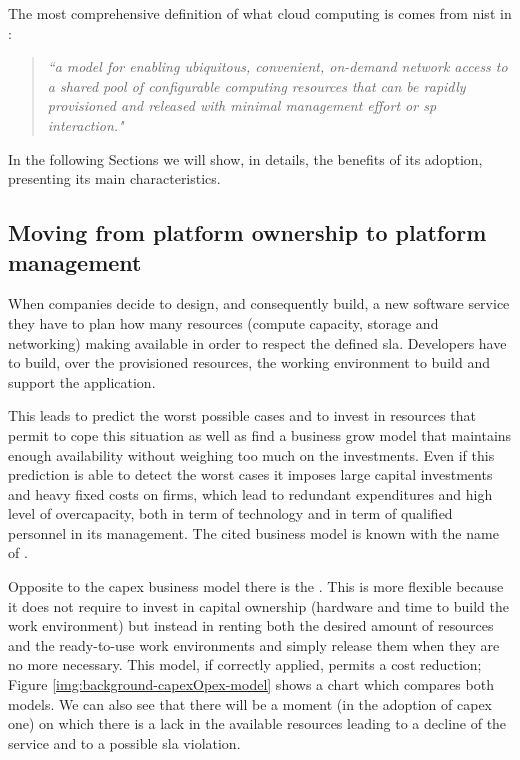 The most comprehensive definition of what cloud computing is comes from \ac{nist} in \cite{nistCloudComputing}:

\begin{center}
	\begin{quote}
		\textit{``a model for enabling ubiquitous, convenient, on-demand network access
			to a shared pool of configurable computing resources that can be rapidly provisioned and released
			with minimal management effort or \acf{sp} interaction."}
	\end{quote}
\end{center}

In the following Sections we will show, in details, the benefits of its adoption, presenting its main
characteristics.

\subsection{Moving from platform ownership to platform management}
\label{sec:background-cloudComputing-capexOpex}
When companies decide to design, and consequently build, a new software service they have to plan how
many resources (compute capacity, storage and networking) making available in order to respect the defined
\ac{sla}. Developers have to build, over the provisioned resources, the working environment to build
and support the application.

This leads to predict the worst possible cases and to invest in resources that permit to cope this
situation as well as find a business grow model that maintains enough availability without weighing
too much on the investments. Even if this prediction is able to detect the worst cases it imposes
large capital investments and heavy fixed costs on firms, which lead to redundant expenditures and
high level of overcapacity, both in term of technology and in term of qualified personnel in its
management. The cited business model is known with the name of .

Opposite to the \ac{capex} business model there is the . This is more flexible
because it does not require to invest in capital ownership (hardware and time to build the work
environment) but instead in renting both the desired amount of resources and the ready-to-use work
environments and simply release them when they are no more necessary. This model, if correctly applied,
permits a cost reduction; Figure \ref{img:background-capexOpex-model} shows a chart which compares
both models. We can also see that there will be a moment (in the adoption of \ac{capex} one) on which
there is a lack in the available resources leading to a decline of the service and to a possible \ac{sla}
violation.

